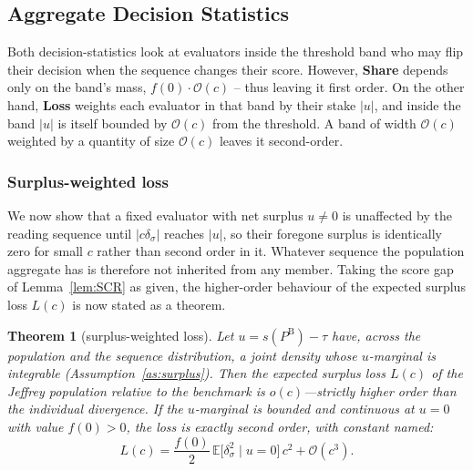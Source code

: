 \documentclass[a4paper,fleqn]{cas-sc}
\newtheorem{theorem}{Theorem}
\theoremstyle{remark}
\theoremstyle{definition}
\newcommand{\PB}{P^{\mathrm{B}}}
\newcommand{\E}{\mathbb{E}}
\newcommand{\bigO}{\mathcal{O}}
\newcommand{\anchor}[1]{}
\begin{document}
\subsection{Aggregate Decision Statistics}

Both decision-statistics look at evaluators inside the threshold band who may flip their decision when the sequence changes their score. However, \textbf{Share} depends only on the band's mass, $f(0)\cdot\bigO(c)$ -- thus leaving it first order. On the other hand, \textbf{Loss} weights each evaluator in that band by their stake $|u|$, and inside the band $|u|$ is itself bounded by $\bigO(c)$ from the threshold. A band of width $\bigO(c)$ weighted by a quantity of size $\bigO(c)$ leaves it second-order.

\subsubsection{Surplus-weighted loss}
\label{sec:welfare}

We now show that a fixed evaluator with net surplus $u\neq0$ is  unaffected by the reading sequence until $|c\delta_\sigma|$ reaches $|u|$, so their foregone surplus
is identically zero for small $c$ rather than second order in it. Whatever sequence the population
aggregate has is therefore not inherited from any member. Taking the score gap of
Lemma~\ref{lem:SCR} as given, the higher-order behaviour of the expected surplus loss $L(c)$ is
now stated as a theorem.

\renewcommand{\thetheorem}{LOS}%
\begin{theorem}[surplus-weighted loss]\label{thm:LOS}
Let $u=s(\PB)-\tau$ have, across the population and the sequence distribution, a joint density
whose $u$-marginal is integrable (Assumption~\ref{as:surplus}). Then the expected surplus loss $L(c)$ of the Jeffrey
population relative to the benchmark is $o(c)$---strictly higher order than the individual
divergence. If the $u$-marginal is bounded and continuous at $u=0$ with value
$f(0)>0$, the loss is exactly second order, with constant named:
\[
  L(c)=\frac{f(0)}{2}\,\E\!\big[\delta_\sigma^{2}\mid u=0\big]\,c^{2}+\bigO(c^{3}).
\]
\anchor{Thm.~LOS}
\end{theorem}
\end{document}
